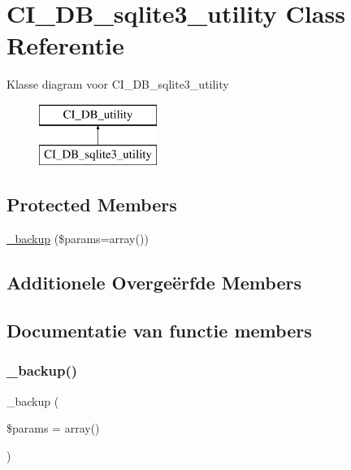 \hypertarget{class_c_i___d_b__sqlite3__utility}{}\section{C\+I\+\_\+\+D\+B\+\_\+sqlite3\+\_\+utility Class Referentie}
\label{class_c_i___d_b__sqlite3__utility}
Klasse diagram voor C\+I\+\_\+\+D\+B\+\_\+sqlite3\+\_\+utility\begin{figure}[H]
\begin{center}
\leavevmode
\includegraphics[height=2.000000cm]{class_c_i___d_b__sqlite3__utility}
\end{center}
\end{figure}
\subsection*{Protected Members}
\begin{DoxyCompactItemize}
\item 
\mbox{\hyperlink{class_c_i___d_b__sqlite3__utility_a30f3053d2c82e7562349924363507afa}{\+\_\+backup}} (\$params=array())
\end{DoxyCompactItemize}
\subsection*{Additionele Overge\"{e}rfde Members}


\subsection{Documentatie van functie members}
\mbox{\label{class_c_i___d_b__sqlite3__utility_a30f3053d2c82e7562349924363507afa}} 
\subsubsection{\texorpdfstring{\_backup()}{\_backup()}}
{\footnotesize\ttfamily \+\_\+backup (\begin{DoxyParamCaption}\item[{}]{\$params = {\ttfamily array()} }\end{DoxyParamCaption})\hspace{0.3cm}{\ttfamily [protected]}}

